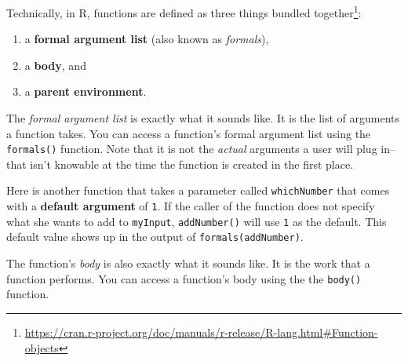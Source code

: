 \documentclass[
  12pt,
  krantz2]{krantz}
\makeatletter
\newenvironment{Shaded}{\begin{snugshade}}{\end{snugshade}}
\newcommand{\AttributeTok}[1]{\textcolor[rgb]{0.61,0.61,0.61}{#1}}
\newcommand{\CommentTok}[1]{\textcolor[rgb]{0.37,0.37,0.37}{\textit{#1}}}
\newcommand{\ControlFlowTok}[1]{\textcolor[rgb]{0.27,0.27,0.27}{\textbf{#1}}}
\newcommand{\DecValTok}[1]{\textcolor[rgb]{0.06,0.06,0.06}{#1}}
\newcommand{\DocumentationTok}[1]{\textcolor[rgb]{0.37,0.37,0.37}{\textbf{\textit{#1}}}}
\newcommand{\FunctionTok}[1]{\textcolor[rgb]{0,0,0}{#1}}
\newcommand{\NormalTok}[1]{#1}
\newcommand{\OtherTok}[1]{\textcolor[rgb]{0.37,0.37,0.37}{#1}}
\newcommand{\SpecialCharTok}[1]{\textcolor[rgb]{0,0,0}{#1}}
\providecommand{\tightlist}{%
  \setlength{\itemsep}{0pt}\setlength{\parskip}{0pt}}
\renewcommand{\href}[2]{#2\footnote{\url{#1}}}
\newenvironment{kframe}{%
\medskip{}
\setlength{\fboxsep}{.8em}
 \def\at@end@of@kframe{}%
 \ifinner\ifhmode%
  \def\at@end@of@kframe{\end{minipage}}%
  \begin{minipage}{\columnwidth}%
 \fi\fi%
 \def\FrameCommand##1{\hskip\@totalleftmargin \hskip-\fboxsep
 \colorbox{shadecolor}{##1}\hskip-\fboxsep
     \hskip-\linewidth \hskip-\@totalleftmargin \hskip\columnwidth}%
 \MakeFramed {\advance\hsize-\width
   \@totalleftmargin\z@ \linewidth\hsize
   \@setminipage}}%
 {\par\unskip\endMakeFramed%
 \at@end@of@kframe}
\renewenvironment{Shaded}{\begin{kframe}}{\end{kframe}}
\makeatother
\begin{document}
Technically, in R, functions are \href{https://cran.r-project.org/doc/manuals/r-release/R-lang.html\#Function-objects}{defined as three things bundled together}:

\begin{enumerate}
\def\labelenumi{\arabic{enumi}.}
\tightlist
\item
  a \textbf{formal argument list} (also known as \emph{formals}),
\item
  a \textbf{body}, and
\item
  a \textbf{parent environment}.
\end{enumerate}

The \emph{formal argument list} is exactly what it sounds like. It is the list of arguments a function takes. You can access a function's formal argument list using the \texttt{formals()} function. Note that it is not the \emph{actual} arguments a user will plug in--that isn't knowable at the time the function is created in the first place.

Here is another function that takes a parameter called \texttt{whichNumber} that comes with a \textbf{default argument} of \texttt{1}. If the caller of the function does not specify what she wants to add to \texttt{myInput}, \texttt{addNumber()} will use \texttt{1} as the default. This default value shows up in the output of \texttt{formals(addNumber)}.

\begin{Shaded}
\end{Shaded}

The function's \emph{body} is also exactly what it sounds like. It is the work that a function performs. You can access a function's body using the the \texttt{body()} function.
\end{document}
